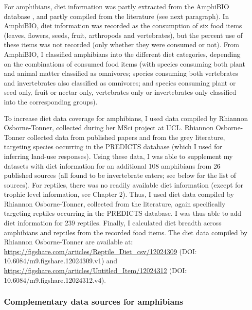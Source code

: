For amphibians, diet information was partly extracted from the AmphiBIO database \citep{Oliveira2017}, and partly compiled from the literature (see next paragraph). In AmphiBIO, diet information was recorded as the consumption of six food items (leaves, flowers, seeds, fruit, arthropods and vertebrates), but the percent use of these items was not recorded (only whether they were consumed or not). From AmphiBIO, I classified amphibians into the different diet categories, depending on the combinations of consumed food items (with species consuming both plant and animal matter classified as omnivores; species consuming both vertebrates and invertebrates also classified as omnivores; and species consuming plant or seed only, fruit or nectar only, vertebrates only or invertebrates only classified into the corresponding groups). 

To increase diet data coverage for amphibians, I used data compiled by Rhiannon Osborne-Tonner, collected during her MSci project at UCL. Rhiannon Osborne-Tonner collected data from published papers and from the grey literature, targeting species occurring in the PREDICTS database (which I used for inferring land-use responses). Using these data, I was able to supplement my datasets with diet information for an additional 108 amphibians from 26 published sources (all found to be invertebrate eaters; see below for the list of sources). For reptiles, there was no readily available diet information (except for trophic level information, see Chapter 2). Thus, I used diet data compiled by Rhiannon Osborne-Tonner, collected from the literature, again specifically targeting reptiles occurring in the PREDICTS database. I was thus able to add diet information for 239 reptiles. Finally, I calculated diet breadth across amphibians and reptiles from the recorded food items. The diet data compiled by Rhiannon Osborne-Tonner are available at:
\url{https://figshare.com/articles/Reptile_Diet_csv/12024309} (DOI: 10.6084/m9.figshare.12024309.v1) and
\url{https://figshare.com/articles/Untitled_Item/12024312} (DOI: 10.6084/m9.figshare.12024312.v4).

\subsubsection*{Complementary data sources for amphibians}

